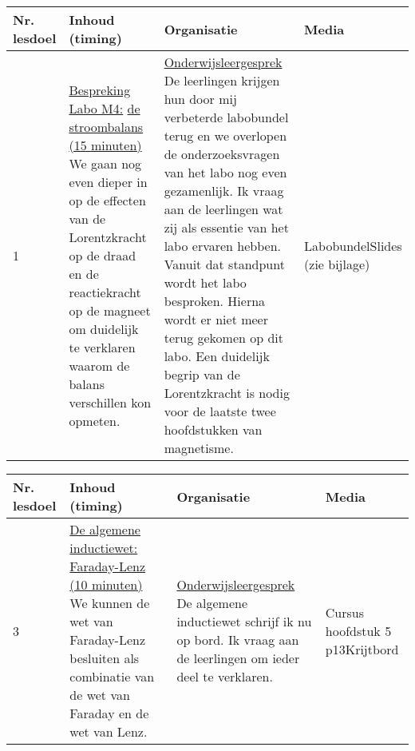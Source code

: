 \begin{landscape}
\newpage
	
	\begin{tabularx}{1.56\textwidth}{|p{1.5cm}|p{9cm}|X|p{4cm}|}
		\hline
		\textbf{Nr. lesdoel } & \textbf{Inhoud (timing)}  & \textbf{Organisatie } & \textbf{Media } \\ \hline
		1	&\underline{Bespreking Labo M4:} \underline{de stroombalans (15 minuten)}\newline
		We gaan nog even dieper in op de effecten van de Lorentzkracht op de draad en de reactiekracht op de magneet om duidelijk te verklaren waarom de balans verschillen kon opmeten.
		&  \underline{Onderwijsleergesprek}\newline 
		De leerlingen krijgen hun door mij verbeterde labobundel terug en we overlopen de onderzoeksvragen van het labo nog even gezamenlijk. Ik vraag aan de leerlingen wat zij als essentie van het labo ervaren hebben. Vanuit dat standpunt wordt het labo besproken. Hierna wordt er niet meer terug gekomen op dit labo. Een duidelijk begrip van de Lorentzkracht is nodig voor de laatste twee hoofdstukken van magnetisme.
		&  Labobundel\newline\newline Slides (zie bijlage)
		\\ \hline
	\end{tabularx}\vspace{5mm}

	
\begin{tabularx}{1.56\textwidth}{|p{1.5cm}|p{8cm}|X|p{4cm}|}
	\hline
	\textbf{Nr. lesdoel } & \textbf{Inhoud (timing)}  & \textbf{Organisatie } & \textbf{Media } \\ \hline
	3\newline\newline 4\newline\newline &\underline{De algemene inductiewet:} \underline{Faraday-Lenz (10 minuten)}\newline
	We kunnen de wet van Faraday-Lenz besluiten als combinatie van de wet van Faraday en de wet van Lenz.
	&  \underline{Onderwijsleergesprek}\newline 
	De algemene inductiewet schrijf ik nu op bord. Ik vraag aan de leerlingen om ieder deel te verklaren.
	&   Cursus hoofdstuk 5 p13\newline\newline Krijtbord 
	\\ \hline
\end{tabularx}\vspace{5mm}



\end{landscape}
